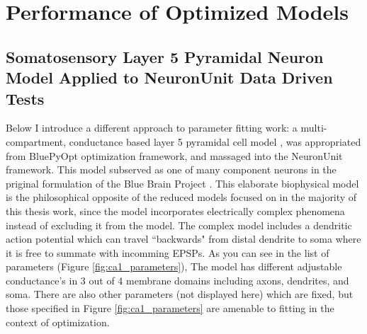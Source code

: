 



%


\section{Performance of Optimized Models}


\subsection{Somatosensory Layer 5 Pyramidal Neuron Model Applied to NeuronUnit Data Driven Tests}

Below I introduce a different approach to parameter fitting work: a multi-compartment, conductance based layer 5 pyramidal cell model \citep{van2016bluepyopt}, was appropriated from BluePyOpt optimization framework, and massaged into the NeuronUnit framework.
This model subserved as one of many component neurons in the priginal formulation of the Blue Brain Project \cite{markram2015reconstruction}.
This elaborate biophysical model is the philosophical opposite of the reduced models focused on in the majority of this thesis work, since the model incorporates electrically complex phenomena instead of excluding it from the model.
The complex model includes a dendritic action potential which can travel ``backwards" from distal dendrite to soma where it is free to summate with incomming EPSPs.
As you can see in the list of parameters (Figure \ref{fig:ca1_parameters}), The model has different adjustable conductance's in 3 out of 4 membrane domains including axons, dendrites, and soma.
There are also other parameters (not displayed here) which are fixed, but those specified in Figure  \ref{fig:ca1_parameters} are amenable to fitting in the context of optimization.


